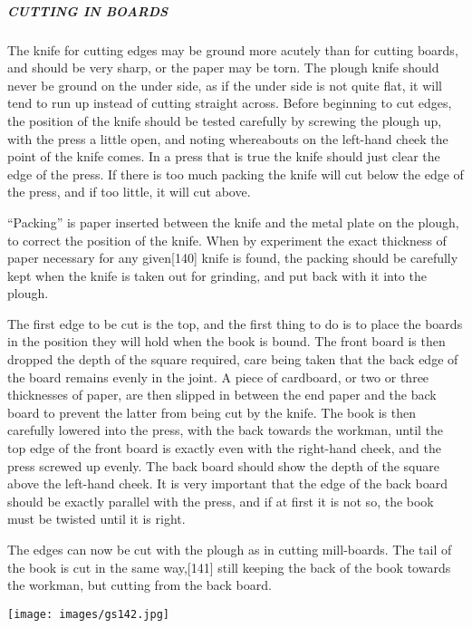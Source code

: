 \documentclass[
]{article}
\begin{document}
\hypertarget{cutting-in-boards}{%
\subparagraph{CUTTING IN BOARDS}\label{cutting-in-boards}}

{The} knife for cutting edges may be ground more acutely than for
cutting boards, and should be very sharp, or the paper may be torn. The
plough knife should never be ground on the under side, as if the under
side is not quite flat, it will tend to run up instead of cutting
straight across. Before beginning to cut edges, the position of the
knife should be tested carefully by screwing the plough up, with the
press a little open, and noting whereabouts on the left-hand cheek the
point of the knife comes. In a press that is true the knife should just
clear the edge of the press. If there is too much packing the knife will
cut below the edge of the press, and if too little, it will cut above.

``Packing'' is paper inserted between the knife and the metal plate on
the plough, to correct the position of the knife. When by experiment the
exact thickness of paper necessary for any
given{\protect\hypertarget{Page_140}{}{{[}140{]}}} knife is found, the
packing should be carefully kept when the knife is taken out for
grinding, and put back with it into the plough.

The first edge to be cut is the top, and the first thing to do is to
place the boards in the position they will hold when the book is bound.
The front board is then dropped the depth of the square required, care
being taken that the back edge of the board remains evenly in the joint.
A piece of cardboard, or two or three thicknesses of paper, are then
slipped in between the end paper and the back board to prevent the
latter from being cut by the knife. The book is then carefully lowered
into the press, with the back towards the workman, until the top edge of
the front board is exactly even with the right-hand cheek, and the press
screwed up evenly. The back board should show the depth of the square
above the left-hand cheek. It is very important that the edge of the
back board should be exactly parallel with the press, and if at first it
is not so, the book must be twisted until it is right.

The edges can now be cut with the plough as in cutting mill-boards. The
tail of the book is cut in the same
way,{\protect\hypertarget{Page_141}{}{{[}141{]}}} still keeping the back
of the book towards the workman, but cutting from the back board.

\protect\hypertarget{Fig_54}{}{}
\texttt{[image: images/gs142.jpg]}
\end{document}
